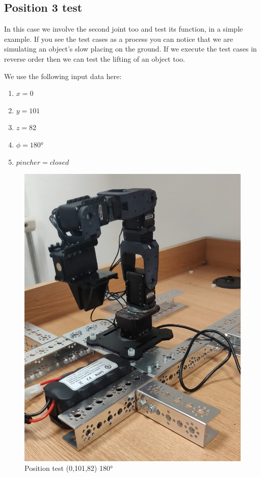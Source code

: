 		\subsection{Position 3 test}
		
			\hspace{15pt}In this case we involve the second joint too and test its function, in a simple example. If you see the test cases as a process you can notice that we are simulating an object’s slow placing on the ground. If we execute the test cases in reverse order then we can test the lifting of an object too. 
			
			We use the following input data here:
		
			\begin{enumerate}
				\item $x = 0$ \\
				\item $y = 101$ \\
				\item $z = 82$ \\
				\item $\phi = 180°$ \\
				\item $pincher = closed$ \\
			\end{enumerate}
		
			\begin{figure}[H]
				\centering
				\includegraphics[scale=0.11]{./images/test_3}
				\caption{Position test (0,101,82) 180°}
			\end{figure}
			
